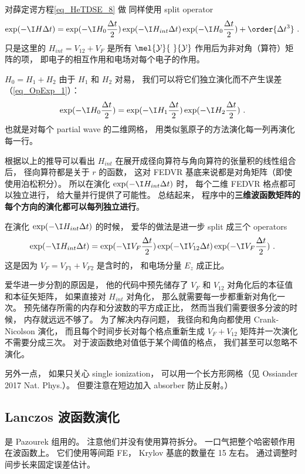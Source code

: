 对薛定谔方程\autoref{eq_HeTDSE_8} 做 同样使用 split operator 
\begin{equation}
\exp(-\I H\Delta t) = \exp(-\I H_0\frac{\Delta t}{2})\exp(-\I H_{int}\Delta t) \exp(-\I H_0\frac{\Delta t}{2}) + \order{\Delta t^3}~.
\end{equation}
只是这里的 $H_{int} = V_{12} + V_F$ 是所有 $\mel{\mathcal{Y}}{\ }{\mathcal{Y}}$ 作用后为非对角（算符）矩阵的项， 即电子的相互作用和电场对每个电子的作用。

$H_0 = H_1 + H_2$ 由于 $H_1$ 和 $H_2$ 对易， 我们可以将它们独立演化而不产生误差（\autoref{eq_OpExp_1}）：
\begin{equation}
\exp(-\I H_0 \frac{\Delta t}{2}) = \exp(-\I H_1 \frac{\Delta t}{2}) \exp(-\I H_2 \frac{\Delta t}{2})~.
\end{equation}
也就是对每个 partial wave 的二维网格， 用类似氢原子的方法演化每一列再演化每一行。

根据以上的推导可以看出 $H_{int}$ 在展开成径向算符与角向算符的张量积的线性组合后， 径向算符都是关于 $r$ 的函数， 这对 FEDVR 基底来说都是对角矩阵（即使使用泊松积分）。 所以在演化 $\exp(-\I H_{int}\Delta t)$ 时， 每个二维 FEDVR 格点都可以独立进行， 给大量并行提供了可能性。 总结起来， 程序中的\textbf{三维波函数矩阵的每个方向的演化都可以每列独立进行}。

在演化 $\exp(-\I H_{int}\Delta t)$ 的时候， 爱华的做法是进一步 split 成三个 operators
\begin{equation}\label{eq_HeTDSE_4}
\exp(-\I H_{int}\Delta t) = \exp(-\I V_F\frac{\Delta t}{2})   \exp(-\I V_{12} \Delta t) \exp(-\I V_F\frac{\Delta t}{2})~.
\end{equation}
这是因为 $V_F = V_{F1} + V_{F2}$ 是含时的， 和电场分量 $E_z$ 成正比。

爱华进一步分割的原因是， 他的代码中预先储存了 $V_F$ 和 $V_{12}$ 对角化后的本征值和本征矢矩阵， 如果直接对 $H_{int}$ 对角化， 那么就需要每一步都重新对角化一次。 预先储存所需的内存和分波数的平方成正比， 然而当我们需要很多分波的时候， 内存就远远不够了。 为了解决内存问题， 我径向和角向都使用 Crank-Nicolson 演化， 而且每个时间步长对每个格点重新生成 $V_F + V_{12}$ 矩阵并一次演化不需要分成三次。 对于波函数绝对值低于某个阈值的格点， 我们甚至可以忽略不演化。

另外一点， 如果只关心 single ionization， 可以用一个长方形网格（见 Ossiander 2017 Nat. Phys.）。 但要注意在短边加入 absorber 防止反射。）

\subsection{Lanczos 波函数演化}
是 Pazourek 组用的。 注意他们并没有使用算符拆分。 一口气把整个哈密顿作用在波函数上。 它们使用等间距 FE， Krylov 基底的数量在 15 左右。 通过调整时间步长来固定误差估计。

